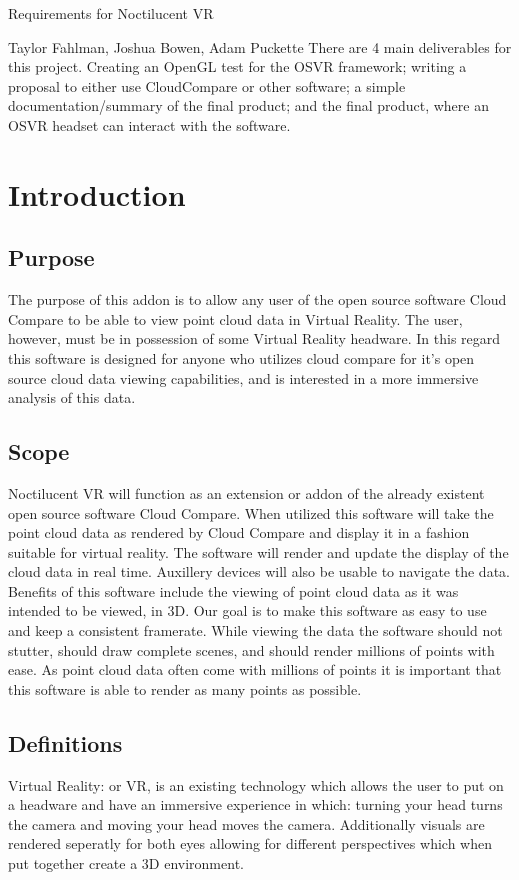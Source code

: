 \documentclass[titlepage]{article}
\begin{document}
\begin{titlepage}
\centering
{\Huge Requirements for Noctilucent VR\par}
{\Large Taylor Fahlman, Joshua Bowen, Adam Puckette}
\abstract
There are 4 main deliverables for this project. Creating an OpenGL test for the OSVR framework;
writing a proposal to either use CloudCompare or other software; a simple documentation/summary of
the final product; and the final product, where an OSVR headset can interact with the software.
\end{titlepage}

\section{Introduction}
\subsection{Purpose}

The purpose of this addon is to allow any user of the open source software Cloud Compare to be able to view point cloud data in Virtual Reality.
The user, however, must be in possession of some Virtual Reality headware. 
In this regard this software is designed for anyone who utilizes cloud compare for it's open source cloud data viewing capabilities,
and is interested in a more immersive analysis of this data.

\subsection{Scope}

Noctilucent VR will function as an extension or addon of the already existent open source software Cloud Compare.
When utilized this software will take the point cloud data as rendered by Cloud Compare and display it in a fashion suitable for virtual reality.
The software will render and update the display of the cloud data in real time.
Auxillery devices will also be usable to navigate the data.
Benefits of this software include the viewing of point cloud data as it was intended to be viewed, in 3D.
Our goal is to make this software as easy to use and keep a consistent framerate.
While viewing the data the software should not stutter,
should draw complete scenes,
and should render millions of points with ease.
As point cloud data often come with millions of points it is important that this software is able to render as many points as possible.

\subsection{Definitions}

Virtual Reality: or VR, is an existing technology which allows the user to put on a headware and have an immersive experience in which:
turning your head turns the camera and
moving your head moves the camera.
Additionally visuals are rendered seperatly for both eyes allowing for different perspectives which when put together create a 3D environment.
\end{document}
